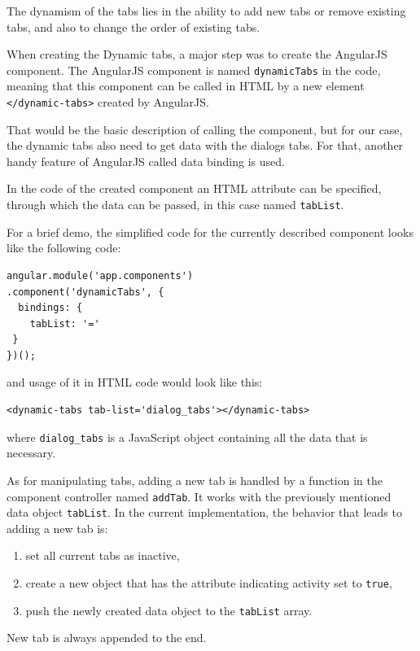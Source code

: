 The dynamism of the tabs lies in the ability to add new tabs or remove existing
tabs, and also to change the order of existing tabs.

When creating the Dynamic tabs, a major step was to create the AngularJS
component.
The AngularJS component is named {\tt dynamicTabs} in the code, meaning that
this component can be called in HTML by a new element
{\tt <dynamic-tabs></dynamic-tabs>} created by AngularJS.

That would be the basic description of calling the component, but for our case,
the dynamic tabs also need to get data with the dialogs tabs.
For that, another handy feature of AngularJS called data binding is used.

In the code of the created component an HTML attribute can be specified,
through which the data can be passed, in this case named {\tt tabList}.

For a brief demo, the simplified code for the currently described component
looks like the following code:

\begin{lstlisting}
angular.module('app.components')
.component('dynamicTabs', {
  bindings: {
    tabList: '='
 }
})();
\end{lstlisting}

and usage of it in HTML code would look like this:

\begin{lstlisting}
<dynamic-tabs tab-list='dialog_tabs'></dynamic-tabs>
\end{lstlisting}

where {\tt dialog\_tabs} is a JavaScript object containing all the data that
is necessary.

As for manipulating tabs, adding a new tab is handled by a function
in the component controller named {\tt addTab}. It works with the previously
mentioned data object {\tt tabList}.
In the current implementation, the behavior that leads to adding a new tab is:

\begin{enumerate}
  \item set all current tabs as inactive,
  \item create a new object that has the attribute indicating activity set to {\tt true},
  \item push the newly created data object to the {\tt tabList} array.
\end{enumerate}

New tab is always appended to the end.

